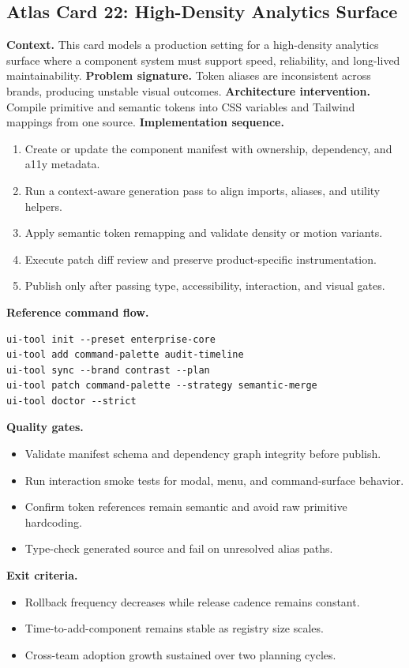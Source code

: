 \subsection*{Atlas Card 22: High-Density Analytics Surface}
\textbf{Context.} This card models a production setting for a high-density analytics surface where a component system must support speed, reliability, and long-lived maintainability.
\textbf{Problem signature.} Token aliases are inconsistent across brands, producing unstable visual outcomes.
\textbf{Architecture intervention.} Compile primitive and semantic tokens into CSS variables and Tailwind mappings from one source.
\textbf{Implementation sequence.}
\begin{enumerate}[leftmargin=*, itemsep=0.28em]
  \item Create or update the component manifest with ownership, dependency, and a11y metadata.
  \item Run a context-aware generation pass to align imports, aliases, and utility helpers.
  \item Apply semantic token remapping and validate density or motion variants.
  \item Execute patch diff review and preserve product-specific instrumentation.
  \item Publish only after passing type, accessibility, interaction, and visual gates.
\end{enumerate}
\textbf{Reference command flow.}
\begin{verbatim}
ui-tool init --preset enterprise-core
ui-tool add command-palette audit-timeline
ui-tool sync --brand contrast --plan
ui-tool patch command-palette --strategy semantic-merge
ui-tool doctor --strict
\end{verbatim}
\textbf{Quality gates.}
\begin{itemize}[leftmargin=*, itemsep=0.24em]
  \item Validate manifest schema and dependency graph integrity before publish.
  \item Run interaction smoke tests for modal, menu, and command-surface behavior.
  \item Confirm token references remain semantic and avoid raw primitive hardcoding.
  \item Type-check generated source and fail on unresolved alias paths.
\end{itemize}
\textbf{Exit criteria.}
\begin{itemize}[leftmargin=*, itemsep=0.24em]
  \item Rollback frequency decreases while release cadence remains constant.
  \item Time-to-add-component remains stable as registry size scales.
  \item Cross-team adoption growth sustained over two planning cycles.
\end{itemize}
\clearpage
